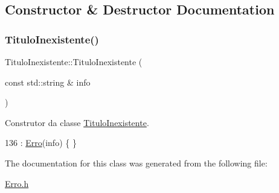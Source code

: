 \subsection{Constructor \& Destructor Documentation}
\mbox{\label{classTituloInexistente_a0404090789fc608b5a08027bba811784}} 
\subsubsection{\texorpdfstring{Titulo\+Inexistente()}{TituloInexistente()}}
{\footnotesize\ttfamily Titulo\+Inexistente\+::\+Titulo\+Inexistente (\begin{DoxyParamCaption}\item[{const std\+::string \&}]{info }\end{DoxyParamCaption})\hspace{0.3cm}{\ttfamily [inline]}}



Construtor da classe \hyperlink{classTituloInexistente}{Titulo\+Inexistente}. 


\begin{DoxyCode}
136 : \hyperlink{classErro_a15d79796bd17517ff05d45eee55556f1}{Erro}(info) \{ \}
\end{DoxyCode}


The documentation for this class was generated from the following file\+:\begin{DoxyCompactItemize}
\item 
\hyperlink{Erro_8h}{Erro.\+h}\end{DoxyCompactItemize}
